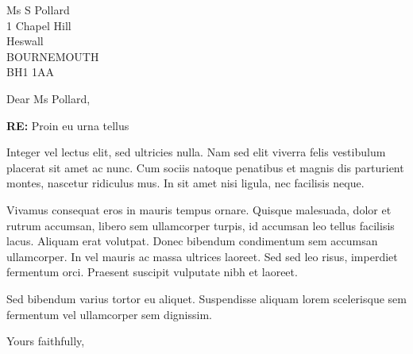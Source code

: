 \documentclass[a4paper,11pt]{letter}
\begin{document}
%
%
%
%

\signature{%
  John Citizen%
}
\address{%
  Fictitious Laboratory\\
  Imaginary Organisation\\
  Level 7 17 Jones St
  North Sydney\quad{}NSW\quad{}2060\\
  AUSTRALIA\\[1ex]
  \textsc{Phone:} +61 491 570 156\\
  \textsc{Email:} \texttt{john.citizen@example.com}
}
\def\today{%
  26 April 2023%
}

%
%
%
%

\begin{letter}{%
    Ms S Pollard\\
    1 Chapel Hill\\
    Heswall\\
    BOURNEMOUTH\\
    BH1 1AA
  }

  \opening{Dear Ms Pollard,}

  \begin{center}
    \textbf{RE:} Proin eu urna tellus
  \end{center}

  Integer vel lectus elit, sed ultricies nulla. Nam sed elit viverra
  felis vestibulum placerat sit amet ac nunc. Cum sociis natoque
  penatibus et magnis dis parturient montes, nascetur ridiculus mus. In
  sit amet nisi ligula, nec facilisis neque.

  Vivamus consequat eros in mauris tempus ornare. Quisque malesuada,
  dolor et rutrum accumsan, libero sem ullamcorper turpis, id accumsan
  leo tellus facilisis lacus. Aliquam erat volutpat. Donec bibendum
  condimentum sem accumsan ullamcorper. In vel mauris ac massa ultrices
  laoreet. Sed sed leo risus, imperdiet fermentum orci. Praesent
  suscipit vulputate nibh et laoreet.

  Sed bibendum varius tortor eu aliquet. Suspendisse aliquam lorem
  scelerisque sem fermentum vel ullamcorper sem dignissim.

  \closing{Yours faithfully,}

\end{letter}
\end{document}
